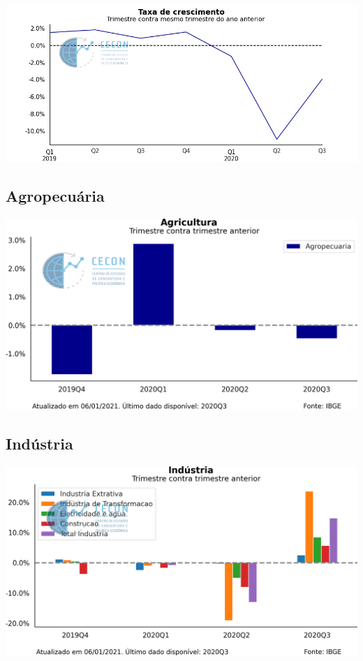 \documentclass{SelfArx}
\begin{document}
\begin{center}
\includegraphics[width=.9\linewidth]{./figs/PIB/PIB_YoY.png}
\end{center}

\subsection*{Agropecuária}
\label{sec:orgbaeaf7f}

\begin{center}
\includegraphics[width=.9\linewidth]{./figs/PIB/Agropecuaria.png}
\end{center}

\subsection*{Indústria}
\label{sec:orgde0eb77}

\begin{center}
\includegraphics[width=.9\linewidth]{./figs/PIB/Industria.png}
\end{center}
\end{document}
